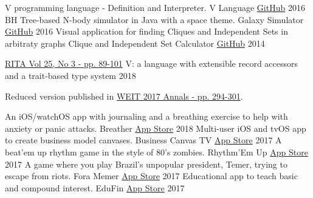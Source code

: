 

\begin{cventries}
  \cvcompactentry
    {V programming language - Definition and Interpreter.}
    {V Language}
    {\href{https://github.com/AvatarHurden/V}{GitHub}}
    {2016}
  \cvcompactentry
    {BH Tree-based N-body simulator in Java with a space theme.}
    {Galaxy Simulator}
    {\href{https://github.com/AvatarHurden/Simulador-Galaxias}{GitHub}}
    {2016}
  \cvcompactentry
    {Visual application for finding Cliques and Independent Sets in arbitraty graphs}
    {Clique and Independent Set Calculator}
    {\href{https://github.com/AvatarHurden/Clique-and-Ind.Set-Calculator}{GitHub}}
    {2014}
\end{cventries}

\newpage


\begin{cventries}
  \cventry
    {\href{http://seer.ufrgs.br/rita/article/view/VOL25_NR3_89}{RITA Vol 25, No 3 - pp. 89-101}}
    {V: a language with extensible record accessors and a trait-based type system}
    {2018}
    {}
    {
      \begin{cvitems}
        \item {Reduced version published in \href{http://weit2017.inf.ufsm.br/wp-content/uploads/2017/10/Versao_final.pdf}{WEIT 2017 Annals - pp. 294-301}}.
      \end{cvitems}
    }
\end{cventries}


\begin{cventries}
  \cvcompactentry
    {An iOS/watchOS app with journaling and a breathing exercise to help with anxiety or panic attacks.}
    {Breather}
    {\href{https://itunes.apple.com/app/id1370659046?mt=8}{App Store}}
    {2018}
  \cvcompactentry
    {Multi-user iOS and tvOS app to create business model canvases.}
    {Business Canvas TV}
    {\href{https://itunes.apple.com/app/id1292335686?mt=8}{App Store}}
    {2017}
  \cvcompactentry
    {A beat'em up rhythm game in the style of 80's zombies.}
    {Rhythm'Em Up}
    {\href{https://itunes.apple.com/app/id1262013610?mt=8}{App Store}}
    {2017}
  \cvcompactentry
    {A game where you play Brazil's unpopular president, Temer, trying to escape from riots.}
    {Fora Memer}
    {\href{https://itunes.apple.com/br/app/fora-memer/id1253655537?l=en&mt=8}{App Store}}
    {2017}
  \cvcompactentry
    {Educational app to teach basic and compound interest.}
    {EduFin}
    {\href{https://itunes.apple.com/app/id1231577657?mt=8}{App Store}}
    {2017}
\end{cventries}

